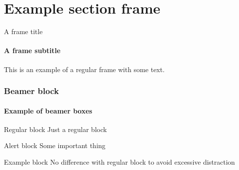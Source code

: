 \titleframe


\section{Example section frame}

\begin{frame}{A frame title}
\framesubtitle{A frame subtitle}
  This is an example of a regular frame with some text. 
\end{frame}


\begin{frame}
  \frametitle{Beamer block}
  \framesubtitle{Example of beamer boxes}
  \begin{block}{Regular block}
    Just a regular block
  \end{block}
  \begin{alertblock}{Alert block}
    Some important thing
  \end{alertblock}
  \begin{exampleblock}{Example block}
    No difference with regular block to avoid excessive distraction
  \end{exampleblock}
\end{frame}

